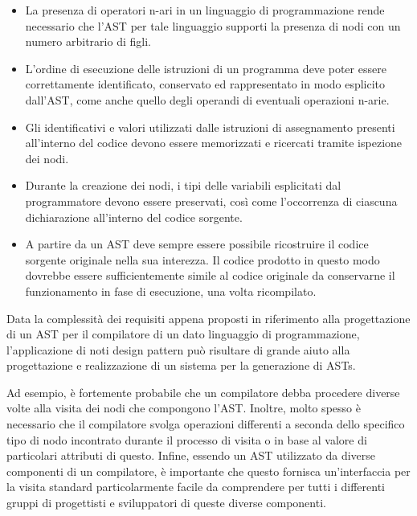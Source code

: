 \begin{itemize}

\item La presenza di operatori n-ari in un linguaggio di programmazione rende
necessario che l’AST per tale linguaggio supporti la presenza di nodi con un
numero arbitrario di figli.

\item L’ordine di esecuzione delle istruzioni di un programma deve poter essere
correttamente identificato, conservato ed rappresentato in modo esplicito
dall’AST, come anche quello degli operandi di eventuali operazioni n-arie.

\item Gli identificativi e valori utilizzati dalle istruzioni di assegnamento
presenti all’interno del codice devono essere memorizzati e ricercati tramite
ispezione dei nodi.

\item Durante la creazione dei nodi, i tipi delle variabili esplicitati dal
programmatore devono essere preservati, così come l'occorrenza di ciascuna
dichiarazione all’interno del codice sorgente.

\item A partire da un AST deve sempre essere possibile ricostruire il codice
sorgente originale nella sua interezza. Il codice prodotto in questo modo
dovrebbe essere sufficientemente simile al codice originale da conservarne il
funzionamento in fase di esecuzione, una volta ricompilato.\\

\end{itemize}

Data la complessità dei requisiti appena proposti in riferimento alla
progettazione di un AST per il compilatore di un dato linguaggio di
programmazione, l’applicazione di noti design pattern può risultare di grande
aiuto alla progettazione e  realizzazione di un sistema per la generazione di
ASTs.

Ad esempio, è fortemente probabile che un compilatore debba procedere diverse
volte alla visita dei nodi che compongono l’AST. Inoltre, molto spesso è
necessario che il compilatore svolga operazioni differenti a seconda dello
specifico tipo di nodo incontrato durante il processo di visita o in base al
valore di particolari attributi di questo. Infine, essendo un AST utilizzato da
diverse componenti di un compilatore, è importante che questo fornisca
un’interfaccia per la visita standard particolarmente facile da comprendere per
tutti i differenti gruppi di progettisti e sviluppatori di queste diverse
componenti.


